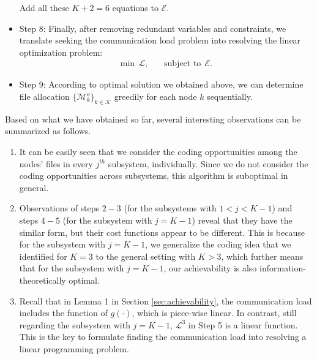 \documentclass[conference]{IEEEtran}
\begin{document}
\begin{itemize}
Add all these $K+2=6$ equations to $\mathcal{E}$.

\item{Step 8:} Finally, after removing redundant variables and constraints, we translate seeking the communication load problem into resolving the linear optimization problem:
\begin{eqnarray*}
\textrm{min} ~~ \mathcal{L},~~~~~~~~\textrm{subject to} ~~ \mathcal{E}.
\end{eqnarray*}

\item{Step 9:} According to optimal solution we obtained above, we can determine file allocation $\{\mathcal{M}_k^o\}_{k\in\mathcal{K}}$ greedily for each node $k$ sequentially.

\end{itemize}



\begin{remark}
Based on what we have obtained so far, several interesting observations can be summarized as follows.
\begin{enumerate}

\item It can be easily seen that we consider the coding opportunities among the nodes' files in every $j^{th}$ subsystem, individually. Since we do not consider the coding opportunities across subsystems, this algorithm is suboptimal in general.

\item Observations of steps $2-3$ (for the subsystems with $1<j<K-1$) and steps $4-5$ (for the subsystem with $j=K-1$) reveal that they have the similar form, but their cost functions appear to be different. This is because for the subsystem with $j=K-1$, we generalize the coding idea that we identified for $K=3$ to the general setting with $K>3$, which further means that for the subsystem with $j=K-1$, our achievability is also information-theoretically optimal.

\item Recall that in Lemma 1 in Section \ref{sec:achievability}, the communication load includes the function of $g(\cdot)$, which is piece-wise linear. In contrast, still regarding the subsystem with $j=K-1$, $\mathcal{L}^3$ in Step 5 is a linear function. This is the key to formulate finding the communication load into resolving a linear programming problem.

\end{enumerate}

\end{remark}
\end{document}
